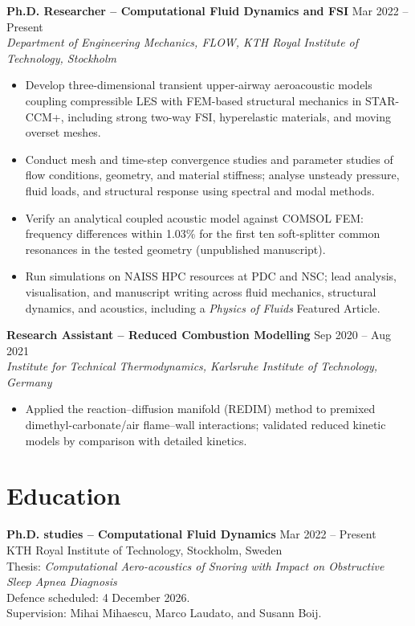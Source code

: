 \documentclass[a4paper,10pt]{article}
\begin{document}
\vspace{3pt}
\textbf{Ph.D. Researcher -- Computational Fluid Dynamics and FSI}
\hfill Mar 2022 -- Present\\
\textit{Department of Engineering Mechanics, FLOW, KTH Royal Institute of Technology, Stockholm}
\begin{itemize}
\item Develop three-dimensional transient upper-airway aeroacoustic models coupling compressible
LES with FEM-based structural mechanics in STAR-CCM+, including strong two-way FSI,
hyperelastic materials, and moving overset meshes.
\item Conduct mesh and time-step convergence studies and parameter studies of flow conditions,
geometry, and material stiffness; analyse unsteady pressure, fluid loads, and structural response
using spectral and modal methods.
\item Verify an analytical coupled acoustic model against COMSOL FEM: frequency differences
within 1.03\% for the first ten soft-splitter common resonances in the tested geometry
(unpublished manuscript).
\item Run simulations on NAISS HPC resources at PDC and NSC; lead analysis, visualisation, and
manuscript writing across fluid mechanics, structural dynamics, and acoustics, including a
\textit{Physics of Fluids} Featured Article.
\end{itemize}

\vspace{3pt}
\textbf{Research Assistant -- Reduced Combustion Modelling}
\hfill Sep 2020 -- Aug 2021\\
\textit{Institute for Technical Thermodynamics, Karlsruhe Institute of Technology, Germany}
\begin{itemize}
\item Applied the reaction--diffusion manifold (REDIM) method to premixed dimethyl-carbonate/air
flame--wall interactions; validated reduced kinetic models by comparison with detailed kinetics.
\end{itemize}

\newpage

\section{Education}
\textbf{Ph.D. studies -- Computational Fluid Dynamics}
\hfill Mar 2022 -- Present\\
KTH Royal Institute of Technology, Stockholm, Sweden\\
Thesis: \textit{Computational Aero-acoustics of Snoring with Impact on Obstructive Sleep Apnea Diagnosis}\\
Defence scheduled: 4 December 2026.\\
Supervision: Mihai Mihaescu, Marco Laudato, and Susann Boij.
\end{document}
